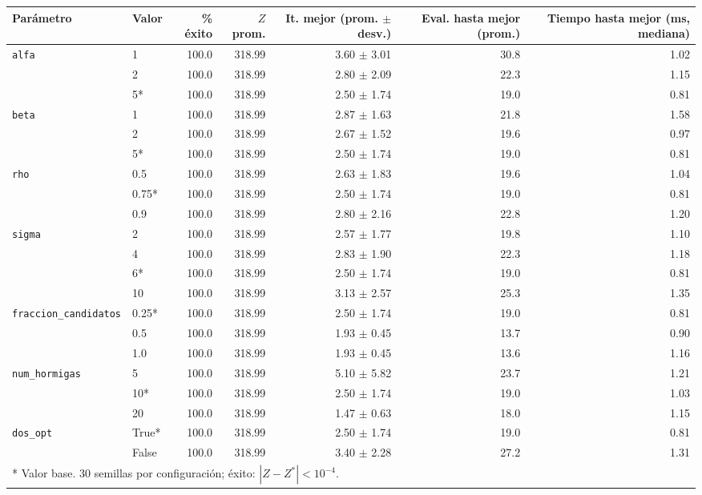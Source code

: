 \begin{tabular}{llrrrrr}
\toprule
Parámetro & Valor & \% éxito & $Z$ prom. & It. mejor (prom. $\pm$ desv.) & Eval. hasta mejor (prom.) & Tiempo hasta mejor (ms, mediana) \\
\midrule
\texttt{alfa} & 1 & 100.0 & 318.99 & 3.60 $\pm$ 3.01 & 30.8 & 1.02 \\
 & 2 & 100.0 & 318.99 & 2.80 $\pm$ 2.09 & 22.3 & 1.15 \\
 & 5* & 100.0 & 318.99 & 2.50 $\pm$ 1.74 & 19.0 & 0.81 \\
\midrule
\texttt{beta} & 1 & 100.0 & 318.99 & 2.87 $\pm$ 1.63 & 21.8 & 1.58 \\
 & 2 & 100.0 & 318.99 & 2.67 $\pm$ 1.52 & 19.6 & 0.97 \\
 & 5* & 100.0 & 318.99 & 2.50 $\pm$ 1.74 & 19.0 & 0.81 \\
\midrule
\texttt{rho} & 0.5 & 100.0 & 318.99 & 2.63 $\pm$ 1.83 & 19.6 & 1.04 \\
 & 0.75* & 100.0 & 318.99 & 2.50 $\pm$ 1.74 & 19.0 & 0.81 \\
 & 0.9 & 100.0 & 318.99 & 2.80 $\pm$ 2.16 & 22.8 & 1.20 \\
\midrule
\texttt{sigma} & 2 & 100.0 & 318.99 & 2.57 $\pm$ 1.77 & 19.8 & 1.10 \\
 & 4 & 100.0 & 318.99 & 2.83 $\pm$ 1.90 & 22.3 & 1.18 \\
 & 6* & 100.0 & 318.99 & 2.50 $\pm$ 1.74 & 19.0 & 0.81 \\
 & 10 & 100.0 & 318.99 & 3.13 $\pm$ 2.57 & 25.3 & 1.35 \\
\midrule
\texttt{fraccion\_candidatos} & 0.25* & 100.0 & 318.99 & 2.50 $\pm$ 1.74 & 19.0 & 0.81 \\
 & 0.5 & 100.0 & 318.99 & 1.93 $\pm$ 0.45 & 13.7 & 0.90 \\
 & 1.0 & 100.0 & 318.99 & 1.93 $\pm$ 0.45 & 13.6 & 1.16 \\
\midrule
\texttt{num\_hormigas} & 5 & 100.0 & 318.99 & 5.10 $\pm$ 5.82 & 23.7 & 1.21 \\
 & 10* & 100.0 & 318.99 & 2.50 $\pm$ 1.74 & 19.0 & 1.03 \\
 & 20 & 100.0 & 318.99 & 1.47 $\pm$ 0.63 & 18.0 & 1.15 \\
\midrule
\texttt{dos\_opt} & True* & 100.0 & 318.99 & 2.50 $\pm$ 1.74 & 19.0 & 0.81 \\
 & False & 100.0 & 318.99 & 3.40 $\pm$ 2.28 & 27.2 & 1.31 \\
\midrule
\multicolumn{7}{l}{* Valor base. 30 semillas por configuración; éxito: $|Z - Z^*| < 10^{-4}$.} \\
\bottomrule
\end{tabular}
